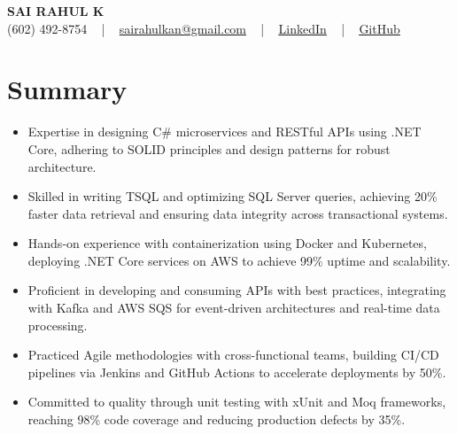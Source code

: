 \documentclass[letterpaper,11pt]{article}
\newcommand{\resumeItem}[1]{
  \item\footnotesize{
    {#1 \vspace{-2pt}}
  }
}
\newcommand{\resumeItemListStart}{\begin{itemize}[leftmargin=*]}
\newcommand{\resumeItemListEnd}{\end{itemize}\vspace{-5pt}}
\begin{document}
\begin{center}
    {\fontsize{14pt}{12pt}\selectfont \textbf{\MakeUppercase{Sai Rahul K}}}\\ \vspace{2pt}
    \fontsize{10pt}{12pt}\selectfont (602) 492-8754 ~ | ~ \href{mailto:sairahulkan@gmail.com}{sairahulkan@gmail.com} ~ | ~
    \href{https://www.linkedin.com/in/rq123/}{\color{blue}\underline{LinkedIn}} ~ | ~
    \href{https://github.com/kanrahuldo}{\color{blue}\underline{GitHub}}~
    \vspace{-8pt}
\end{center}

\section{Summary}
\fontsize{9pt}{10pt}\selectfont
\resumeItemListStart
    \resumeItem{Expertise in designing C\# microservices and RESTful APIs using .NET Core, adhering to SOLID principles and design patterns for robust architecture.}
    \resumeItem{Skilled in writing TSQL and optimizing SQL Server queries, achieving 20\% faster data retrieval and ensuring data integrity across transactional systems.}
    \resumeItem{Hands-on experience with containerization using Docker and Kubernetes, deploying .NET Core services on AWS to achieve 99\% uptime and scalability.}
    \resumeItem{Proficient in developing and consuming APIs with best practices, integrating with Kafka and AWS SQS for event-driven architectures and real-time data processing.}
    \resumeItem{Practiced Agile methodologies with cross-functional teams, building CI/CD pipelines via Jenkins and GitHub Actions to accelerate deployments by 50\%.}
    \resumeItem{Committed to quality through unit testing with xUnit and Moq frameworks, reaching 98\% code coverage and reducing production defects by 35\%.}
\resumeItemListEnd
\vspace{-6pt}
\end{document}

